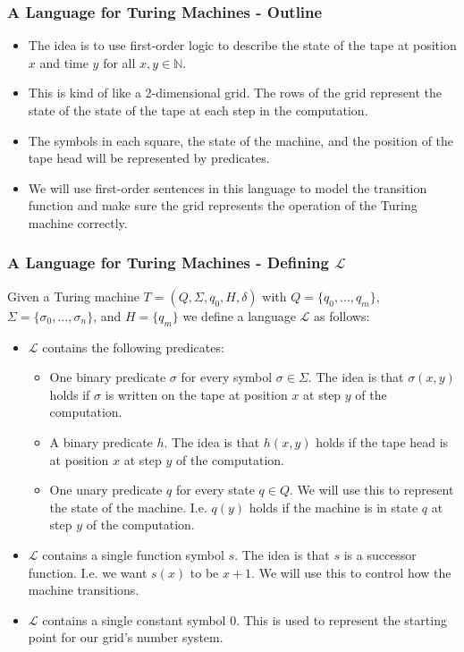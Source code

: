 \documentclass[handout]{beamer}
\begin{document}
\begin{frame}
\frametitle{A Language for Turing Machines - Outline} 
\begin{itemize}
\item The idea is to use first-order logic to describe the state of the tape at position $x$ and time $y$ for all $x,y\in\mathbb{N}$. 
\vspace{0.3cm}
\item This is kind of like a 2-dimensional grid. The rows of the grid represent the state of the state of the tape at each step in the computation.
\vspace{0.3cm} 
\item The symbols in each square, the state of the machine, and the position of the tape head will be represented by predicates. 
\vspace{0.3cm}
\item We will use first-order sentences in this language to model the transition function and make sure the grid represents the operation of the Turing machine correctly.
\end{itemize}
\end{frame}

\begin{frame}
\frametitle{A Language for Turing Machines - Defining $\mathscr{L}$} 
Given a Turing machine $T=(Q,\Sigma,q_0,H,\delta)$ with $Q=\{q_0,\ldots,q_m\}$, $\Sigma = \{\sigma_0,\ldots,\sigma_n\}$, and $H = \{q_m\}$ we define a language $\mathscr{L}$ as follows:
\begin{itemize}
\item $\mathscr{L}$ contains the following predicates:
\begin{itemize}
\item One binary predicate $\sigma$ for every symbol $\sigma\in\Sigma$. The idea is that $\sigma(x,y)$ holds if $\sigma$ is written on the tape at position $x$ at step $y$ of the computation.
\item A binary predicate $h$. The idea is that $h(x,y)$ holds if the tape head is at position $x$ at step $y$ of the computation.
\item One unary predicate $q$ for every state $q\in Q$. We will use this to represent the state of the machine. I.e. $q(y)$ holds if the machine is in state $q$ at step $y$ of the computation.
\end{itemize}
\item $\mathscr{L}$ contains a single function symbol $s$. The idea is that $s$ is a successor function. I.e. we want $s(x)$ to be $x+1$. We will use this to control how the machine transitions.
\item $\mathscr{L}$ contains a single constant symbol $0$. This is used to represent the starting point for our grid's number system.
\end{itemize}
\end{frame}
\end{document}
